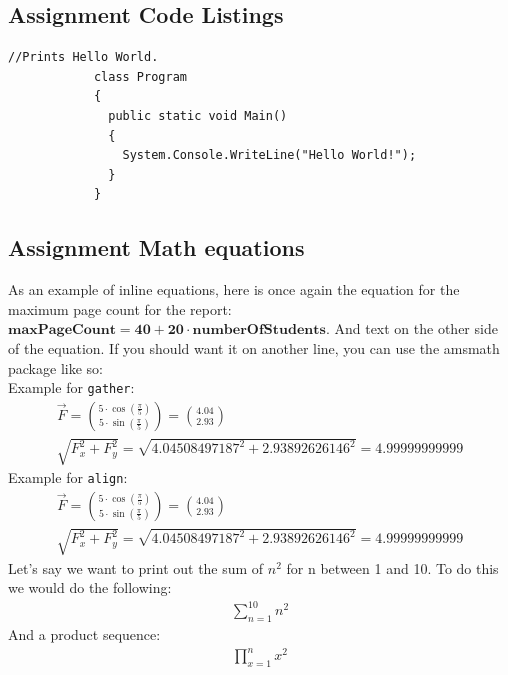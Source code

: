 \documentclass[
english, %
headsepline, %
]{scrartcl} %
\begin{document}
    \subsection{Assignment Code Listings}
        \begin{lstlisting}[language={[Sharp]C}, caption={C\# example}, label={Script}]
            //Prints Hello World.
            class Program
            {
              public static void Main()
              {
                System.Console.WriteLine("Hello World!");
              }
            }
        \end{lstlisting}

    \subsection{Assignment Math equations}
        As an example of inline equations, here is once again the equation for the maximum page count for the report: 
        $\bm{maxPageCount = 40 + 20 \cdot numberOfStudents}$. 
        And text on the other side of the equation. If you should want it on another line, you can use the amsmath package like so:\\
        Example for \texttt{gather}:
        \begin{gather}
            \vec{F} = \binom{5\cdot \cos( \frac{\pi}{5})}{5\cdot \sin( \frac{\pi}{5})}=\binom{4.04}{2.93}\\
            \sqrt{F_x^2 + F_y^2} = \sqrt{4.04508497187^2 + 2.93892626146^2} = 4.99999999999
        \end{gather}
        Example for \texttt{align}:
        \begin{align}
            \vec{F} = \binom{5\cdot \cos( \frac{\pi}{5})}{5\cdot \sin( \frac{\pi}{5})}=\binom{4.04}{2.93}\\
            \sqrt{F_x^2 + F_y^2} = \sqrt{4.04508497187^2 + 2.93892626146^2} = 4.99999999999
        \end{align}
        Let’s say we want to print out the sum of $n^2$ for n between 1 and 10. To do this we would do the following:\\
        \begin{align}
            \sum_{n=1}^{10} n^{2}
            \label{sumExample}
        \end{align}
        And a product sequence:
        \begin{align}
            \prod_{x=1}^{n}x^{2}
            \label{prodExample}
        \end{align}
\end{document}
